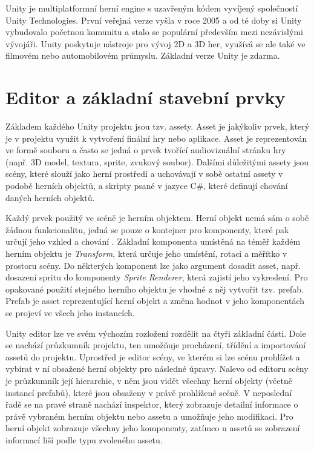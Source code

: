 \documentclass[FM,Proj]{tulthesis}
\begin{document}
	
	Unity je multiplatformní herní engine s uzavřeným kódem vyvíjený společností Unity Technologies. První veřejná verze vyšla v roce 2005 a od té doby si Unity vybudovalo početnou komunitu a stalo se populární především mezi nezávislými vývojáři. Unity poskytuje nástroje pro vývoj 2D a 3D her, využívá se ale také ve filmovém nebo automobilovém průmyslu. Základní verze Unity je zdarma.
	
	\section{Editor a základní stavební prvky}
	
	Základem každého Unity projektu jsou tzv. assety. Asset je jakýkoliv prvek, který je v projektu využit k vytvoření finální hry nebo aplikace. Asset je reprezentován ve formě souboru a často se jedná o prvek tvořící audiovizuální stránku hry (např. 3D model, textura, sprite, zvukový soubor). Dalšími důležitými assety jsou scény, které slouží jako herní prostředí a uchovávají v sobě ostatní assety v podobě herních objektů, a skripty psané v jazyce C\#, které definují chování daných herních objektů.  \cite{UnityDocsAssetWorkflow}
	
	Každý prvek použitý ve scéně je herním objektem. Herní objekt nemá sám o sobě žádnou funkcionalitu, jedná se pouze o kontejner pro komponenty, které pak určují jeho vzhled a chování \cite{UnityDocsGameObject}. Základní komponenta umístěná na téměř každém herním objektu je \textit{Transform}, která určuje jeho umístění, rotaci a měřítko v prostoru scény. Do některých komponent lze jako argument dosadit asset, např. dosazení spritu do komponenty \textit{Sprite Renderer}, která zajistí jeho vykreslení. Pro opakované použití stejného herního objektu je vhodné z něj vytvořit tzv. prefab. Prefab je asset reprezentující herní objekt a změna hodnot v jeho komponentách se projeví ve všech jeho instancích.
	
	Unity editor lze ve svém výchozím rozložení rozdělit na čtyři základní části. Dole se nachází průzkumník projektu, ten umožňuje procházení, třídění a importování assetů do projektu. Uprostřed je editor scény, ve kterém si lze scénu prohlížet a vybírat v ní obsažené herní objekty pro následné úpravy. Nalevo od editoru scény je průzkumník její hierarchie, v něm jsou vidět všechny herní objekty (včetně instancí prefabů), které jsou obsaženy v právě prohlížené scéně. V neposlední řadě se na pravé straně nachází inspektor, který zobrazuje detailní informace o právě vybraném herním objektu nebo assetu a umožňuje jeho modifikaci. Pro herní objekt zobrazuje všechny jeho komponenty, zatímco u assetů se zobrazení informací liší podle typu zvoleného assetu.
	
\end{document}
